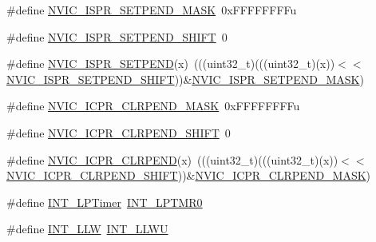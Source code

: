 \begin{DoxyCompactItemize}
\item 
\#define \hyperlink{group___backward___compatibility___symbols_ga0dfd5e3a045907297c9dd71464796792}{N\+V\+I\+C\+\_\+\+I\+S\+P\+R\+\_\+\+S\+E\+T\+P\+E\+N\+D\+\_\+\+M\+A\+SK}~0x\+F\+F\+F\+F\+F\+F\+F\+Fu
\item 
\#define \hyperlink{group___backward___compatibility___symbols_ga67398055aa260b7d62bdcb6c7e1aa202}{N\+V\+I\+C\+\_\+\+I\+S\+P\+R\+\_\+\+S\+E\+T\+P\+E\+N\+D\+\_\+\+S\+H\+I\+FT}~0
\item 
\#define \hyperlink{group___backward___compatibility___symbols_ga8487a7dbee7e52157a16bbe2a6501926}{N\+V\+I\+C\+\_\+\+I\+S\+P\+R\+\_\+\+S\+E\+T\+P\+E\+ND}(x)~(((uint32\+\_\+t)(((uint32\+\_\+t)(x))$<$$<$\hyperlink{group___backward___compatibility___symbols_ga67398055aa260b7d62bdcb6c7e1aa202}{N\+V\+I\+C\+\_\+\+I\+S\+P\+R\+\_\+\+S\+E\+T\+P\+E\+N\+D\+\_\+\+S\+H\+I\+FT}))\&\hyperlink{group___backward___compatibility___symbols_ga0dfd5e3a045907297c9dd71464796792}{N\+V\+I\+C\+\_\+\+I\+S\+P\+R\+\_\+\+S\+E\+T\+P\+E\+N\+D\+\_\+\+M\+A\+SK})
\item 
\#define \hyperlink{group___backward___compatibility___symbols_ga16ce69a282193dc237cb2a889a314ad2}{N\+V\+I\+C\+\_\+\+I\+C\+P\+R\+\_\+\+C\+L\+R\+P\+E\+N\+D\+\_\+\+M\+A\+SK}~0x\+F\+F\+F\+F\+F\+F\+F\+Fu
\item 
\#define \hyperlink{group___backward___compatibility___symbols_ga6391b14d641916849bb245233f7689c2}{N\+V\+I\+C\+\_\+\+I\+C\+P\+R\+\_\+\+C\+L\+R\+P\+E\+N\+D\+\_\+\+S\+H\+I\+FT}~0
\item 
\#define \hyperlink{group___backward___compatibility___symbols_ga447beed0a7c9d98f2e9100dc341ab8f5}{N\+V\+I\+C\+\_\+\+I\+C\+P\+R\+\_\+\+C\+L\+R\+P\+E\+ND}(x)~(((uint32\+\_\+t)(((uint32\+\_\+t)(x))$<$$<$\hyperlink{group___backward___compatibility___symbols_ga6391b14d641916849bb245233f7689c2}{N\+V\+I\+C\+\_\+\+I\+C\+P\+R\+\_\+\+C\+L\+R\+P\+E\+N\+D\+\_\+\+S\+H\+I\+FT}))\&\hyperlink{group___backward___compatibility___symbols_ga16ce69a282193dc237cb2a889a314ad2}{N\+V\+I\+C\+\_\+\+I\+C\+P\+R\+\_\+\+C\+L\+R\+P\+E\+N\+D\+\_\+\+M\+A\+SK})
\item 
\#define \hyperlink{group___backward___compatibility___symbols_ga6a9d815d101ddaba3b70efb7c0c0ec75}{I\+N\+T\+\_\+\+L\+P\+Timer}~\hyperlink{group___interrupt__vector__numbers_gga5f3656e2a154b64aa378a2f3856c3a8dadb33151c23fc4df6fa87f60d1df02dae}{I\+N\+T\+\_\+\+L\+P\+T\+M\+R0}
\item 
\#define \hyperlink{group___backward___compatibility___symbols_ga4a9d8cc9adcc01e215bf64197844759b}{I\+N\+T\+\_\+\+L\+LW}~\hyperlink{group___interrupt__vector__numbers_gga5f3656e2a154b64aa378a2f3856c3a8dabb163a0bbd5ab2c784554ad5da573a75}{I\+N\+T\+\_\+\+L\+L\+WU}
\end{DoxyCompactItemize}


